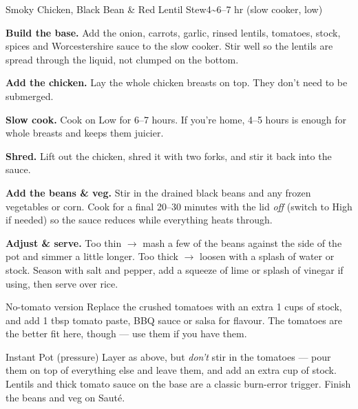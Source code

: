 \begin{recipebox}{Smoky Chicken, Black Bean \& Red Lentil Stew}{4}{\textasciitilde6--7 hr (slow cooker, low)}
\begin{method}
  \item \textbf{Build the base.} Add the onion, carrots, garlic, rinsed lentils,
        tomatoes, stock, spices and Worcestershire sauce to the slow cooker.
        Stir well so the lentils are spread through the liquid, not clumped
        on the bottom.
  \item \textbf{Add the chicken.} Lay the whole chicken breasts on top. They
        don't need to be submerged.
  \item \textbf{Slow cook.} Cook on Low for 6--7 hours. If you're home,
        4--5 hours is enough for whole breasts and keeps them juicier.
  \item \textbf{Shred.} Lift out the chicken, shred it with two forks, and stir
        it back into the sauce.
  \item \textbf{Add the beans \& veg.} Stir in the drained black beans and any
        frozen vegetables or corn. Cook for a final 20--30 minutes with the lid
        \emph{off} (switch to High if needed) so the sauce reduces while
        everything heats through.
  \item \textbf{Adjust \& serve.} Too thin $\rightarrow$ mash a few of the
        beans against the side of the pot and simmer a little longer. Too thick
        $\rightarrow$ loosen with a splash of water or stock. Season with salt
        and pepper, add a squeeze of lime or splash of vinegar if using, then
        serve over rice.
\end{method}

\begin{variationbox}{No-tomato version}
Replace the crushed tomatoes with an extra 1 cups of stock, and
add 1 tbsp tomato paste, BBQ sauce or salsa for flavour. The tomatoes are the
better fit here, though --- use them if you have them.
\end{variationbox}

\begin{variationbox}{Instant Pot (pressure)}
Layer as above, but \emph{don't} stir in the tomatoes --- pour them on top of
everything else and leave them, and add an extra  cup of stock.
Lentils and thick tomato sauce on the base are a classic burn-error trigger.
Finish the beans and veg on Saut\'e.
\end{variationbox}


\end{recipebox}
